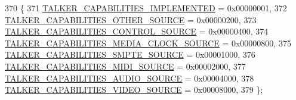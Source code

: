 \begin{DoxyCode}
370 \{
371     \hyperlink{namespaceavdecc__lib_a56bc09f9e88216219c73dfd659c17a03a4202467d2f57a3772209ec3bdbd1ee6f}{TALKER\_CAPABILITIES\_IMPLEMENTED} = 0x00000001,
372     \hyperlink{namespaceavdecc__lib_a56bc09f9e88216219c73dfd659c17a03a7ec943145e487839df027c36eebc256a}{TALKER\_CAPABILITIES\_OTHER\_SOURCE} = 0x00000200,
373     \hyperlink{namespaceavdecc__lib_a56bc09f9e88216219c73dfd659c17a03a795a3ede37367c1b47825581795e7f13}{TALKER\_CAPABILITIES\_CONTROL\_SOURCE} = 0x00000400,
374     \hyperlink{namespaceavdecc__lib_a56bc09f9e88216219c73dfd659c17a03ad28db24ff43e313ebabae7065bcae424}{TALKER\_CAPABILITIES\_MEDIA\_CLOCK\_SOURCE} = 0x00000800,
375     \hyperlink{namespaceavdecc__lib_a56bc09f9e88216219c73dfd659c17a03ad406a33214dca941a44f2d8dc67b74c2}{TALKER\_CAPABILITIES\_SMPTE\_SOURCE} = 0x00001000,
376     \hyperlink{namespaceavdecc__lib_a56bc09f9e88216219c73dfd659c17a03afa09f5077e03762537549b1005137bfe}{TALKER\_CAPABILITIES\_MIDI\_SOURCE} = 0x00002000,
377     \hyperlink{namespaceavdecc__lib_a56bc09f9e88216219c73dfd659c17a03adbde855132bf3e3390f127856cfbf133}{TALKER\_CAPABILITIES\_AUDIO\_SOURCE} = 0x00004000,
378     \hyperlink{namespaceavdecc__lib_a56bc09f9e88216219c73dfd659c17a03a273e0f464eed6b140ff7106dc548e7ad}{TALKER\_CAPABILITIES\_VIDEO\_SOURCE} = 0x00008000,
379 \};
\end{DoxyCode}
